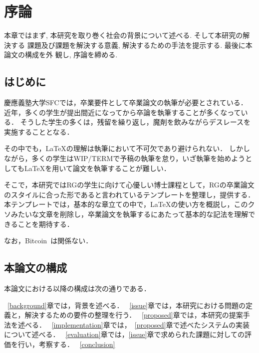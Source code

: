 \chapter{序論}
\label{introduction}

本章ではまず, 本研究を取り巻く社会の背景について述べる. そして本研究の解決する
課題及び課題を解決する意義, 解決するための手法を提示する. 最後に本論文の構成を外
観し, 序論を締める.

\section{はじめに}
\label{introduction:background}
慶應義塾大学SFCでは，卒業要件として卒業論文の執筆が必要とされている．
近年，多くの学生が提出間近になってから卒論を執筆することが多くなっている．
そうした学生の多くは，残留を繰り返し，魔剤を飲みながらデスレースを実施することとなる．

その中でも，\LaTeX の理解は執筆において不可欠であり避けられない．
しかしながら，多くの学生はWIP/TERMで予稿の執筆を怠り，いざ執筆を始めようとしても\LaTeX を用いて論文を執筆することが難しい．

そこで，本研究ではRGの学生に向けて心優しい博士課程として，RGの卒業論文のスタイルに合った形であると言われているテンプレートを整理し，提供する．
本テンプレートでは，基本的な章立ての中で，\LaTeX の使い方を概説し，このクソみたいな文章を削除し，卒業論文を執筆するにあたって基本的な記法を理解できることを期待する．

なお，Bitcoin~\cite{Bitcoin}は関係ない．

\section{本論文の構成}

本論文における以降の構成は次の通りである．

~\ref{background}章では，背景を述べる．
~\ref{issue}章では，本研究における問題の定義と，解決するための要件の整理を行う．
~\ref{proposed}章では，本研究の提案手法を述べる．
~\ref{implementation}章では，~\ref{proposed}章で述べたシステムの実装について述べる．
~\ref{evaluation}章では，\ref{issue}章で求められた課題に対しての評価を行い，考察する．
~\ref{conclusion}





